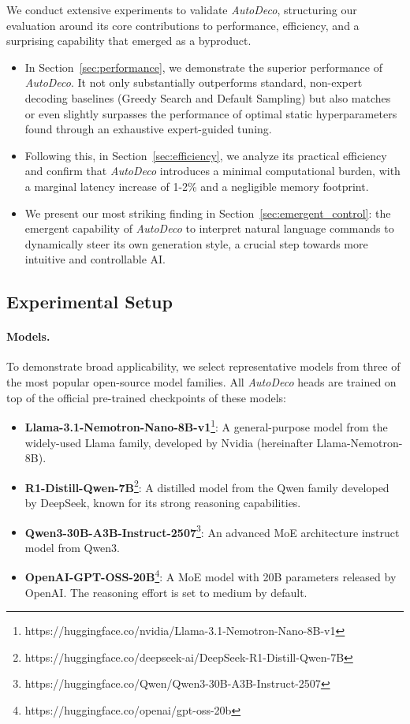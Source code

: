 We conduct extensive experiments to validate \textit{AutoDeco}, structuring our evaluation around its core contributions to performance, efficiency, and a surprising capability that emerged as a byproduct.

\begin{itemize}[leftmargin=2em, ]
    \item In Section~\ref{sec:performance}, we demonstrate the superior performance of \textit{AutoDeco}. It not only substantially outperforms standard, non-expert decoding baselines (Greedy Search and Default Sampling) but also matches or even slightly surpasses the performance of optimal static hyperparameters found through an exhaustive expert-guided tuning.
    \item  Following this, in Section~\ref{sec:efficiency}, we analyze its practical efficiency and confirm that \textit{AutoDeco} introduces a minimal computational burden, with a marginal latency increase of 1-2\% and a negligible memory footprint.
    \item We present our most striking finding in Section~\ref{sec:emergent_control}: the emergent capability of \textit{AutoDeco} to interpret natural language commands to dynamically steer its own generation style, a crucial step towards more intuitive and controllable AI.
\end{itemize}


\subsection{Experimental Setup}
\label{sec:setup}

\paragraph{Models.}
To demonstrate broad applicability, we select representative models from three of the most popular open-source model families. All \textit{AutoDeco} heads are trained on top of the official pre-trained checkpoints of these models:
\begin{itemize}[leftmargin=2em, ]
    \item \textbf{Llama-3.1-Nemotron-Nano-8B-v1}\footnote{https://huggingface.co/nvidia/Llama-3.1-Nemotron-Nano-8B-v1}\citep{bercovich2025llama}: A general-purpose model from the widely-used Llama family, developed by Nvidia (hereinafter Llama-Nemotron-8B).
    \item \textbf{R1-Distill-Qwen-7B}\footnote{https://huggingface.co/deepseek-ai/DeepSeek-R1-Distill-Qwen-7B}\citep{guo2025deepseek}: A distilled model from the Qwen family developed by DeepSeek, known for its strong reasoning capabilities.
    \item \textbf{Qwen3-30B-A3B-Instruct-2507}\footnote{https://huggingface.co/Qwen/Qwen3-30B-A3B-Instruct-2507}\citep{qwen3technicalreport}: An advanced MoE architecture instruct model from Qwen3.
    \item \textbf{OpenAI-GPT-OSS-20B}\footnote{https://huggingface.co/openai/gpt-oss-20b}\citep{agarwal2025gpt}: A MoE model with 20B parameters released by OpenAI. The reasoning effort is set to medium by default.
\end{itemize}

